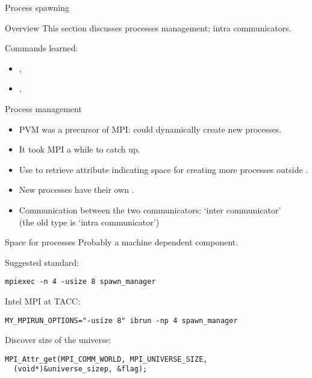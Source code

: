 
 {Process spawning}

\begin{numberedframe}{Overview}
  This section discusses processes management; intra communicators.

  Commands learned:
  \begin{itemize}
  \item {}, 
  \item {}, 
  \end{itemize}
\end{numberedframe}

\begin{numberedframe}{Process management}
  \begin{itemize}
  \item PVM was a precursor of MPI: could dynamically create new
    processes.
  \item It took MPI a while to catch up.
  \item Use  to retrieve
     attribute indicating space for
    creating more processes outside .
  \item New processes have their own .
  \item Communication between the two communicators: `inter
    communicator'\\ (the old type is `intra communicator')
  \end{itemize}
\end{numberedframe}

\begin{numberedframe}{Space for processes}
  Probably a machine dependent component.

  Suggested standard:
\begin{verbatim}
mpiexec -n 4 -usize 8 spawn_manager
\end{verbatim}

  Intel MPI at TACC:
\begin{verbatim}
MY_MPIRUN_OPTIONS="-usize 8" ibrun -np 4 spawn_manager
\end{verbatim}
Discover size of the universe:
\begin{lstlisting}
MPI_Attr_get(MPI_COMM_WORLD, MPI_UNIVERSE_SIZE,
  (void*)&universe_sizep, &flag);
\end{lstlisting}
\end{numberedframe}

